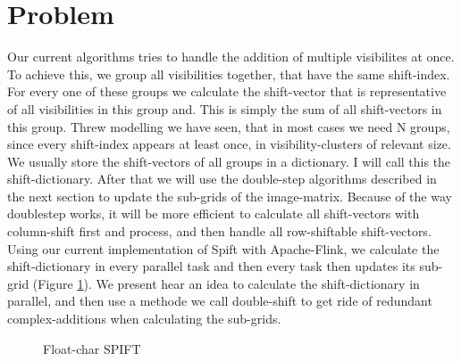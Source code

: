 \documentclass[12pt]{article}
\begin{document}
\maketitle

\section{Problem}
Our current algorithms tries to handle the addition of multiple visibilites at once. To achieve this, we group all visibilities together, that have the same shift-index. For every one of these groups we calculate the shift-vector that is representative of all visibilities in this group and. This is simply the sum of all shift-vectors in this group.
Threw modelling we have seen, that in most cases we need N groups, since every shift-index appears at least once, in visibility-clusters of relevant size. We usually store the shift-vectors of all groups in a dictionary. I will call this the shift-dictionary. After that we will use the double-step algorithms described in the next section to update the sub-grids of the image-matrix. Because of the way doublestep works, it will be more efficient to calculate all shift-vectors with column-shift first and process, and then handle all row-shiftable shift-vectors. \\

Using our current implementation of Spift with Apache-Flink, we calculate the shift-dictionary in every parallel task and then every task then updates its sub-grid (Figure \ref{fig:floatSPIFT}). We present hear an idea to calculate the shift-dictionary in parallel, and then use a methode we call double-shift to get ride of redundant complex-additions when calculating the sub-grids. \\

\begin{figure}

\caption{Float-char SPIFT}
\label{fig:floatSPIFT}
\end{figure}
\end{document}
